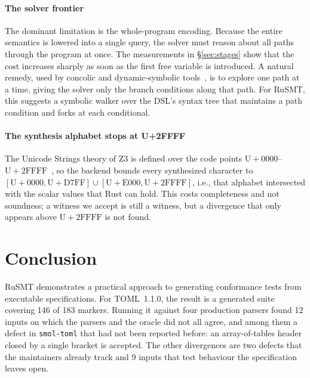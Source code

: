\documentclass[sigconf,screen]{acmart}
\theoremstyle{definition}
\theoremstyle{remark}
\newcommand{\rusmt}{RuSMT}
\newcommand{\toml}{TOML}
\newcommand{\code}[1]{\texttt{#1}}
\newcommand{\markers}{183}       %
\newcommand{\certcount}{146}    %
\newcommand{\divmarkers}{12}   %
\newcommand{\specopen}{9}      %
\begin{document}
\paragraph{The solver frontier}
The dominant limitation is the whole-program encoding. Because the entire semantics is lowered into a single query, the solver must reason about all paths through the program at once. The measurements in \S\ref{sec:stages} show that the cost increases sharply as soon as the first free variable is introduced. A natural remedy, used by concolic and dynamic-symbolic tools~\cite{cadar2008klee,poeplau2020symcc}, is to explore one path at a time, giving the solver only the branch conditions along that path. For \rusmt{}, this suggests a symbolic walker over the DSL's syntax tree that maintains a path condition and forks at each conditional.

\paragraph{The synthesis alphabet stops at U+2FFFF}
The Unicode Strings theory of Z3 is defined over the code points
$\mathrm{U{+}0000}$--$\mathrm{U{+}2FFFF}$~\cite{smtlibunicode}, so the backend
bounds every synthesized character to $[\mathrm{U{+}0000},\mathrm{U{+}D7FF}]
\cup [\mathrm{U{+}E000},\mathrm{U{+}2FFFF}]$, i.e., that alphabet intersected
with the scalar values that Rust can hold. This costs completeness and not soundness; a witness we accept is still a
witness, but a divergence that only appears above $\mathrm{U{+}2FFFF}$ is not
found.

\section{Conclusion}
\label{sec:concl}

\rusmt{} demonstrates a practical approach to generating conformance tests from executable specifications. For \toml{}~1.1.0, the result is a generated suite covering \certcount{} of \markers{} markers. Running it against four production parsers found
\divmarkers{} inputs on which the parsers and the oracle did not all agree, and
among them a defect in \code{smol-toml} that had not been reported before: an
array-of-tables header closed by a single bracket is accepted. The other
divergences are two defects that the maintainers already track and \specopen{}
inputs that test behaviour the specification leaves open.
\end{document}
